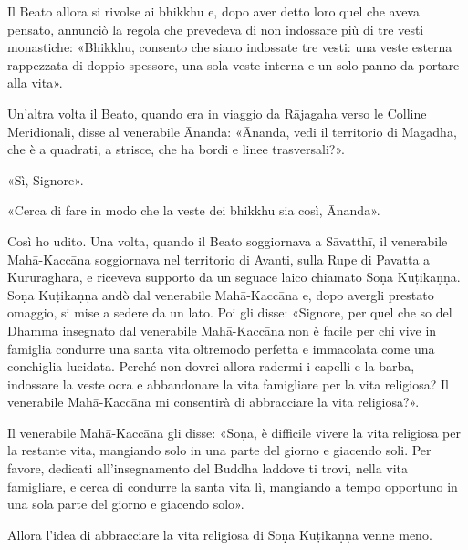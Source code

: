 Il Beato allora si rivolse ai bhikkhu e, dopo aver detto loro quel che aveva
pensato, annunciò la regola che prevedeva di non indossare più di tre vesti
monastiche: «Bhikkhu, consento che siano indossate tre vesti: una veste esterna
rappezzata di doppio spessore, una sola veste interna e un solo panno da portare
alla vita».


Un’altra volta il Beato, quando era in viaggio da Rājagaha verso le Colline
Meridionali, disse al venerabile Ānanda: «Ānanda, vedi il territorio di Magadha,
che è a quadrati, a strisce, che ha bordi e linee trasversali?».

«Sì, Signore».

«Cerca di fare in modo che la veste dei bhikkhu sia così, Ānanda».


 Così ho udito. Una volta, quando il Beato soggiornava a
Sāvatthī, il venerabile Mahā-Kaccāna soggiornava nel territorio di Avanti, sulla
Rupe di Pavatta a Kururaghara, e riceveva supporto da un seguace laico chiamato
Soṇa Kuṭikaṇṇa. Soṇa Kuṭikaṇṇa andò dal venerabile Mahā-Kaccāna e, dopo avergli
prestato omaggio, si mise a sedere da un lato. Poi gli disse: «Signore, per quel
che so del Dhamma insegnato dal venerabile Mahā-Kaccāna non è facile per chi
vive in famiglia condurre una santa vita oltremodo perfetta e immacolata come
una conchiglia lucidata. Perché non dovrei allora radermi i capelli e la barba,
indossare la veste ocra e abbandonare la vita famigliare per la vita religiosa?
Il venerabile Mahā-Kaccāna mi consentirà di abbracciare la vita religiosa?».

Il venerabile Mahā-Kaccāna gli disse: «Soṇa, è difficile vivere la vita
religiosa per la restante vita, mangiando solo in una parte del giorno e
giacendo soli. Per favore, dedicati all’insegnamento del Buddha laddove ti
trovi, nella vita famigliare, e cerca di condurre la santa vita lì, mangiando a
tempo opportuno in una sola parte del giorno e giacendo solo».

Allora l’idea di abbracciare la vita religiosa di Soṇa Kuṭikaṇṇa venne meno.

